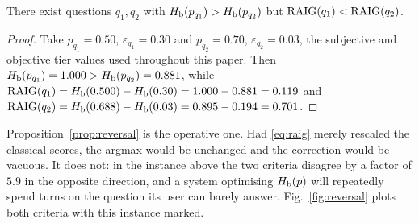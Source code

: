 \begin{proposition}
\label{prop:reversal}
There exist questions $q_1,q_2$ with $H_{\mathrm{b}}(p_{q_1}) > H_{\mathrm{b}}(p_{q_2})$ but
$\mathrm{RAIG}(q_1) < \mathrm{RAIG}(q_2)$.
\end{proposition}

\begin{proof}
Take $p_{q_1}=0.50$, $\varepsilon_{q_1}=0.30$ and $p_{q_2}=0.70$,
$\varepsilon_{q_2}=0.03$, the subjective and objective tier values used
throughout this paper. Then $H_{\mathrm{b}}(p_{q_1})=1.000 > H_{\mathrm{b}}(p_{q_2})=0.881$, while
$\mathrm{RAIG}(q_1)=H_{\mathrm{b}}(0.500)-H_{\mathrm{b}}(0.30)=1.000-0.881=0.119$ and
$\mathrm{RAIG}(q_2)=H_{\mathrm{b}}(0.688)-H_{\mathrm{b}}(0.03)=0.895-0.194=0.701$.
\end{proof}

Proposition~\ref{prop:reversal} is the operative one. Had \eqref{eq:raig}
merely rescaled the classical scores, the argmax would be unchanged and the
correction would be vacuous. It does not: in the instance above the two
criteria disagree by a factor of $5.9$ in the opposite direction, and a system
optimising $H_{\mathrm{b}}(p)$ will repeatedly spend turns on the question its user can
barely answer. Fig.~\ref{fig:reversal} plots both criteria with this instance
marked.

